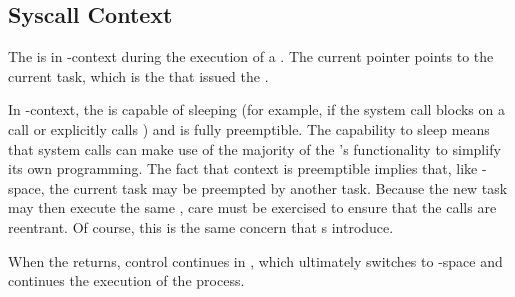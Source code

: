 \subsection{Syscall Context}\label{subsec:Syscall_Context}
The  is in -context during the execution of a .
The current pointer points to the current task, which is the  that issued the .

In -context, the  is capable of sleeping (for example, if the system call blocks on a call or explicitly calls ) and is fully preemptible.
The capability to sleep means that system calls can make use of the majority of the ’s functionality to simplify its own programming.
The fact that  context is preemptible implies that, like -space, the current task may be preempted by another task.
Because the new task may then execute the same , care must be exercised to ensure that the calls are reentrant.
Of course, this is the same concern that s introduce.

When the  returns, control continues in , which ultimately switches to -space and continues the execution of the  process.


